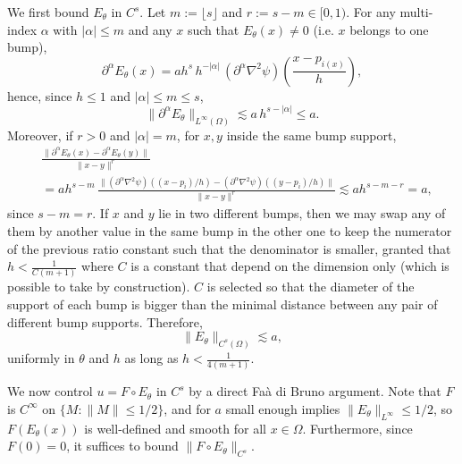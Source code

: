 \documentclass{article}
\newcommand{\1}{\mathds{1}}
\theoremstyle{plain}
\theoremstyle{definition}
\theoremstyle{remark}
\begin{document}
We first bound $E_\theta$ in $C^{s}$. Let $m:=\lfloor s\rfloor$ and $r:=s-m\in[0,1)$.
For any multi-index $\alpha$ with $|\alpha|\le m$ and any $x$ such that $E_\theta(x)\neq 0$ (i.e. $x$ belongs to one bump),
\begin{equation}
\label{eq:E_derivative_bound}
\partial^\alpha E_\theta(x)
=
a h^{s}\, h^{-|\alpha|}\,(\partial^\alpha\nabla^2\psi)\!\left(\frac{x-p_{i(x)}}{h}\right),
\end{equation}
hence, since $h\le 1$ and $|\alpha|\le m\le s$,
\begin{equation}
\label{eq:E_Cm_bound}
\|\partial^\alpha E_\theta\|_{L^\infty(\Omega)}
\lesssim
a\, h^{s-|\alpha|}
\le a.
\end{equation}
Moreover, if $r>0$ and $|\alpha|=m$, for $x,y$ inside the same bump support,
\begin{equation}
\begin{aligned}
   & \frac{\|\partial^\alpha E_\theta(x)-\partial^\alpha E_\theta(y)\|}{\|x-y\|^{r}} \\
&=
a h^{s-m}\,
\frac{\|(\partial^\alpha\nabla^2\psi)((x-p_i)/h)-(\partial^\alpha\nabla^2\psi)((y-p_i)/h)\|}{\|x-y\|^{r}}
\lesssim
a h^{s-m-r}
=
a,
\end{aligned}
\end{equation}
since $s-m=r$. If $x$ and $y$ lie in two different bumps, then we may swap any of them by another value in the same bump in the other one to keep the numerator of the previous ratio constant such that the denominator is smaller, granted that $h < \frac{1}{C (m+1)}$ where $C$ is a constant that depend on the dimension only (which is possible to take by construction). $C$ is selected so that the diameter of the support of each bump is bigger than the minimal distance between any pair of different bump supports.
Therefore,
\begin{equation}
\label{eq:E_Cs_bound}
\|E_\theta\|_{C^{s}(\Omega)} \lesssim a,
\end{equation}
uniformly in $\theta$ and $h$ as long as $h < \frac{1}{4 (m+1)}$.

We now control $u = F\circ E_\theta$ in $C^{s}$ by a direct Fa\`a di Bruno argument.
Note that $F$ is $C^\infty$ on $\{M:\|M\|\le 1/2\}$, and for $a$ small enough  implies
$\|E_\theta\|_{L^\infty}\le 1/2$, so $F(E_\theta(x))$ is well-defined and smooth for all $x\in\Omega$.
Furthermore, since $F(0)=0$, it suffices to bound $\|F\circ E_\theta\|_{C^{s}}$.
\end{document}
